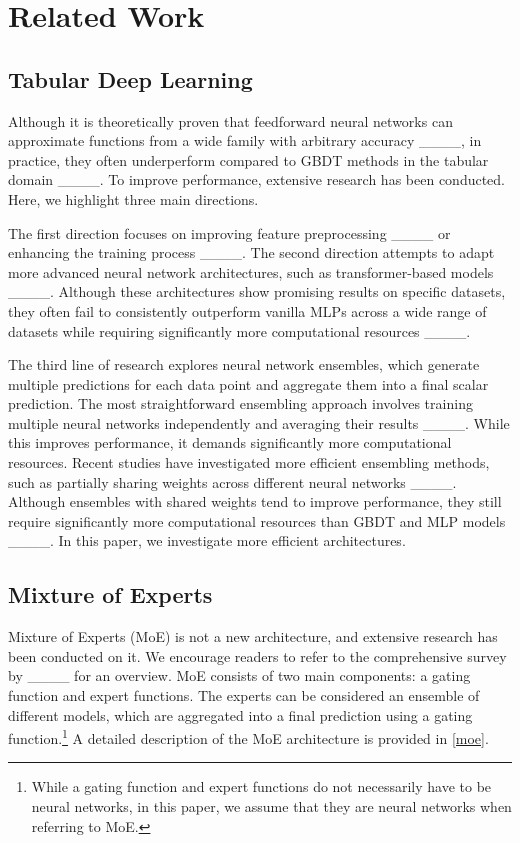 \section{Related Work}
\label{related}

\subsection{Tabular Deep Learning}
Although it is theoretically proven that feedforward neural networks can approximate functions from a wide family with arbitrary accuracy ____, in practice, they often underperform compared to GBDT methods in the tabular domain ____. To improve performance, extensive research has been conducted. Here, we highlight three main directions.

The first direction focuses on improving feature preprocessing ____ or enhancing the training process ____. The second direction attempts to adapt more advanced neural network architectures, such as transformer-based models ____. Although these architectures show promising results on specific datasets, they often fail to consistently outperform vanilla MLPs across a wide range of datasets while requiring significantly more computational resources ____. 

The third line of research explores neural network ensembles, which generate multiple predictions for each data point and aggregate them into a final scalar prediction. The most straightforward ensembling approach involves training multiple neural networks independently and averaging their results ____. While this improves performance, it demands significantly more computational resources. Recent studies have investigated more efficient ensembling methods, such as partially sharing weights across different neural networks ____. Although ensembles with shared weights tend to improve performance, they still require significantly more computational resources than GBDT and MLP models ____. In this paper, we investigate more efficient architectures.

\subsection{Mixture of Experts}
Mixture of Experts (MoE) is not a new architecture, and extensive research has been conducted on it. We encourage readers to refer to the comprehensive survey by ____ for an overview. MoE consists of two main components: a gating function and expert functions. The experts can be considered an ensemble of different models, which are aggregated into a final prediction using a gating function.\footnote{While a gating function and expert functions do not necessarily have to be neural networks, in this paper, we assume that they are neural networks when referring to MoE.} A detailed description of the MoE architecture is provided in \cref{moe}.

